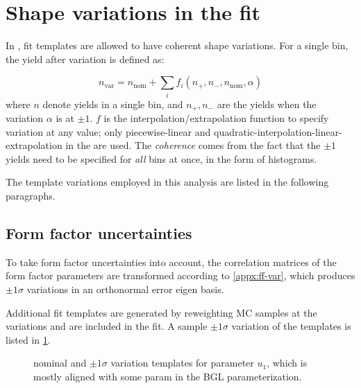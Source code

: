 \section{Shape variations in the fit}
\label{ref:fit:var}

In \HistFactory, fit templates are allowed to have coherent shape variations.
For a single bin, the yield after variation is defined as:

\begin{equation}
    n_\text{var} = n_\text{nom} + \sum_i f_i(n_+, n_-, n_\text{nom}, \alpha)
\end{equation}
where $n$ denote yields in a single bin, and
$n_+, n_-$ are the yields when the variation $\alpha$ is at $\pm 1$.
$f$ is the interpolation/extrapolation function to specify variation
at any value;
only piecewise-linear and quadratic-interpolation-linear-extrapolation
in the \HistFactory are used.
The \emph{coherence} comes from the fact that the $\pm 1$ yields need to be
specified for \emph{all} bins at once, in the form of histograms.

The template variations employed in this analysis are listed in the following
paragraphs.

\subsection{Form factor uncertainties}

To take form factor uncertainties into account, the correlation
matrices of the form factor parameters are transformed
according to \cref{appx:ff-var}, which produces $\pm 1\sigma$ variations
in an orthonormal error eigen basis.

Additional fit templates are generated by reweighting MC samples at the
variations and are included in the fit.
A sample $\pm 1\sigma$ variation of the \Dz\mun templates is listed in
\cref{fig:fit-variations:ff}.

\begin{figure}[htb]

    \caption{
        \Dz\mun nominal and $\pm 1\sigma$ variation templates for
        parameter $u_1$, which is mostly aligned with
        some param in the BGL parameterization.
    }
    \label{fig:fit-variations:ff}
\end{figure}


